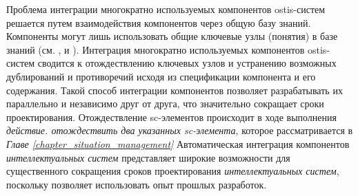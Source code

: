 Проблема интеграции многократно используемых компонентов ostis-систем решается путем взаимодействия компонентов через общую базу знаний. Компоненты могут лишь использовать общие ключевые узлы (понятия) в базе знаний (см. ,  и ). Интеграция многократно используемых компонентов ostis-систем сводится к отождествлению ключевых узлов и устранению возможных дублирований и противоречий исходя из спецификации компонента и его содержания. Такой способ интеграции компонентов позволяет разрабатывать их параллельно и независимо друг от друга, что значительно сокращает сроки проектирования. Отождествление sc-элементов происходит в ходе выполнения \textit{действие. отождествить два указанных sc-элемента}, которое рассматривается в \textit{Главе \ref{chapter_situation_management}} Автоматическая интеграция компонентов \textit{интеллектуальных систем} представляет широкие возможности для существенного сокращения сроков проектирования \textit{интеллектуальных систем}, поскольку позволяет использовать опыт прошлых разработок.
